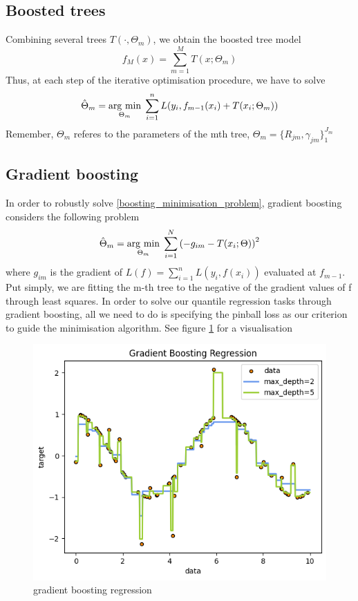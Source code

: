 \subsection{Boosted trees}
Combining several trees $T(\cdot, \Theta_m)$, we obtain the boosted tree model
\begin{equation}
    f_M(x)=\sum\limits_{m=1}^M T(x;\Theta_m)
\end{equation}
Thus, at each step of the iterative optimisation procedure, we have to solve
\begin{equation}\label{boosting_minimisation_problem}
    \hat{\Theta}_m=\underset{\Theta_m}{\operatorname{arg}\,\operatorname{min}}\;\sum\limits_{i=1}^{n}L(y_i, f_{m-1}(x_i)+T(x_i;\Theta_m))
\end{equation}
Remember, $\Theta_m$ referes to the parameters of the mth tree, $\Theta_m=\{R_{jm}, \gamma_{jm}\}_1^{J_m}$
\subsection{Gradient boosting}
In order to robustly solve \ref{boosting_minimisation_problem}, gradient boosting considers the following problem
\begin{equation}
    \hat{\Theta}_m=\underset{\Theta_m}{\operatorname{arg}\,\operatorname{min}}\;\sum\limits_{i=1}^{N}\left(-g_{im}-T(x_i;\Theta)\right)^2
\end{equation}
where $g_{im}$ is the gradient of $L(f)=\sum\limits_{i=1}^n L(y_i, f(x_i))$ evaluated at $f_{m-1}$. Put simply, we are fitting the m-th tree to the negative of the gradient values of f through least squares.
In order to solve our quantile regression tasks through gradient boosting, all we need to do is specifying the pinball loss as our criterion to guide the minimisation algorithm. See figure \ref{fig:gradient_boosting} for a visualisation
\begin{figure}
    \includegraphics[width=\textwidth]{images/gradient_boosting.png}
    \caption{gradient boosting regression}
    \label{fig:gradient_boosting}
\end{figure}



